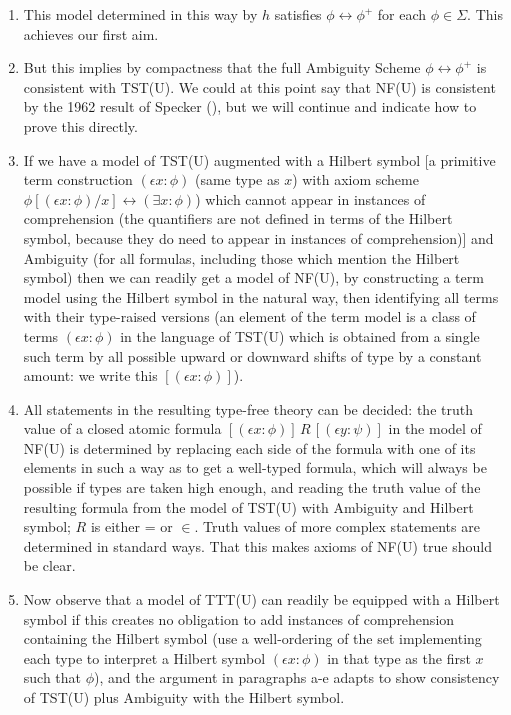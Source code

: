 \documentclass[112pt]{article}
\begin{document}
\begin{description}
\begin{enumerate}
\begin{enumerate}
\item This model determined in this way by $h$ satisfies  $\phi \leftrightarrow \phi^+$ for each $\phi \in \Sigma$.   This achieves our first aim.

\item But this implies by compactness that the full Ambiguity Scheme $\phi \leftrightarrow \phi^+$ is consistent with TST(U).  We could at this point say that  NF(U) is consistent by the 1962 result of Specker (\cite{ambiguity}), but we will continue and indicate how to prove this directly.

\item If we have a model of TST(U) augmented with a Hilbert symbol [a primitive term construction $(\epsilon x:\phi)$ (same type as $x$) with axiom scheme $\phi[(\epsilon x:\phi)/x] \leftrightarrow (\exists x:\phi)$) which cannot appear in instances of comprehension (the quantifiers are not defined in terms of the Hilbert symbol, because they do need to appear in instances of comprehension)] and Ambiguity (for all formulas, including those which mention the Hilbert symbol) then we can readily get a model of NF(U), by constructing a term model using the Hilbert symbol in the natural way, then identifying all terms with their type-raised versions (an element of the term model is a class of terms $(\epsilon x:\phi)$ in the language of TST(U) which is obtained from a single such term by all possible upward or downward shifts of type by a constant amount:  we write this
$[(\epsilon x:\phi)]$).


\item All statements in the resulting type-free theory can be decided:  the truth value of a closed atomic formula $[(\epsilon x:\phi)] \,R\, [(\epsilon y:\psi)]$ in the model of NF(U) is determined by replacing each side of the formula with one of its elements in such a way as to get a well-typed formula, which will always be possible if types are taken high enough, and reading the truth value of the resulting formula  from the model of TST(U) with Ambiguity and Hilbert symbol;  $R$ is either = or $\in$.  Truth values of more complex statements are determined in standard ways.  That this makes axioms of NF(U) true should be clear.

\item  Now observe that a model of TTT(U) can readily be equipped with a Hilbert symbol if this creates no obligation to add instances of comprehension
containing the Hilbert symbol (use a well-ordering of the set implementing each type to interpret a Hilbert symbol  $(\epsilon x:\phi)$ in that type as the first $x$ such that $\phi$), and the argument in paragraphs a-e adapts to show consistency of TST(U) plus Ambiguity with the Hilbert symbol.


\end{enumerate}
\end{enumerate}
\end{description}
\end{document}
